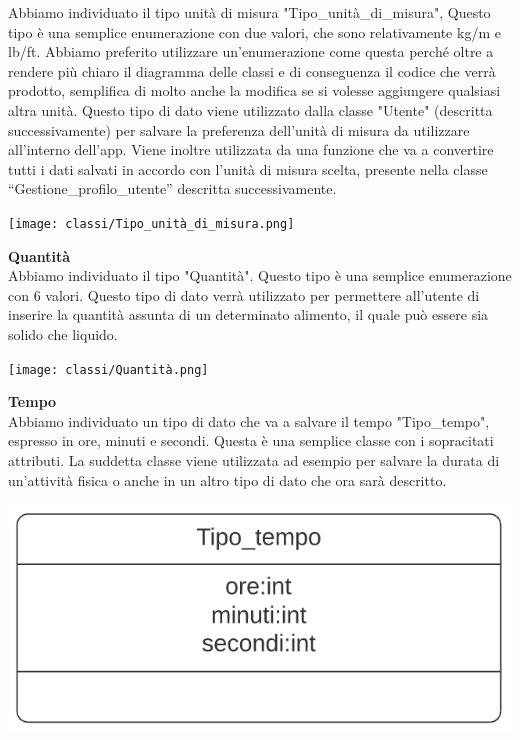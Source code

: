 \documentclass{article}
\begin{document}
      Abbiamo individuato il tipo unità di misura "Tipo\_unità\_di\_misura", Questo tipo è una semplice enumerazione con due valori, che sono
      relativamente kg/m e lb/ft. Abbiamo preferito utilizzare un’enumerazione come questa perché oltre a rendere più chiaro il diagramma delle
      classi e di conseguenza il codice che verrà prodotto, semplifica di molto anche la modifica se si volesse aggiungere qualsiasi altra unità.
      Questo tipo di dato viene utilizzato dalla classe "Utente" (descritta successivamente) per salvare la preferenza dell’unità di misura da
      utilizzare all’interno dell’app. Viene inoltre utilizzata da una funzione che va a convertire tutti i dati salvati in accordo con l’unità di
      misura scelta, presente nella classe “Gestione\_profilo\_utente” descritta successivamente.\\
      \begin{center}
            \texttt{[image: classi/Tipo\_unità\_di\_misura.png]}
      \end{center}

      {\large\textbf{Quantità}}\\

      Abbiamo individuato il tipo "Quantità". Questo tipo è una semplice enumerazione con 6 valori. Questo tipo di dato verrà utilizzato per
      permettere all’utente di inserire la quantità assunta di un determinato alimento, il quale può essere sia solido che liquido.\\
      \begin{center}
            \texttt{[image: classi/Quantità.png]}
      \end{center}

      {\large\textbf{Tempo}}\\

      Abbiamo individuato un tipo di dato che va a salvare il tempo "Tipo\_tempo", espresso in ore, minuti e secondi. Questa è una semplice classe
      con i sopracitati attributi. La suddetta classe viene utilizzata ad esempio per salvare la durata di un’attività fisica o anche in un altro
      tipo di dato che ora sarà descritto.\\
      \begin{center}
            \includegraphics[scale=0.5]{classi/Tipo_tempo.png}
      \end{center}
      
\end{document}
